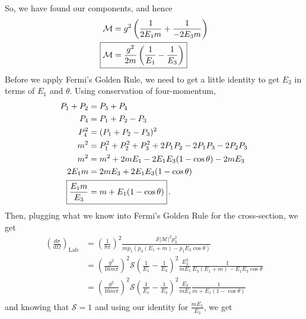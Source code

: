 \documentclass[10pt]{article}
\newcommand{\del}[2][]{\frac{d #1}{d #2}}
\begin{document}
So, we have found our components, and hence
\begin{equation*}
  \begin{split}
    \mathcal{M} & = g^{2}\left(\frac{1}{2E_{1}m} + \frac{1}{-2E_{3}m}\right) \\
    \Aboxed{\mathcal{M} & = \frac{g^{2}}{2m}\left(\frac{1}{E_{1}} - \frac{1}{E_{3}}\right)} \\
  \end{split}
\end{equation*}
Before we apply Fermi's Golden Rule, we need to get a little identity to get $E_{3}$ in terms of $E_{1}$ and $\theta$. Using conservation of four-momentum,
\begin{equation*}
  \begin{split}
    P_{1} + P_{2} & = P_{3} + P_{4} \\
    P_{4} & = P_{1} + P_{2} - P_{3} \\
    P_{4}^{2} & = (P_{1} + P_{2} - P_{3})^{2} \\
    m^{2} & = P_{1}^{2} + P_{2}^{2} + P_{3}^{2} + 2P_{1}P_{2} - 2P_{1}P_{3} - 2P_{2}P_{3} \\
    m^{2} & = m^{2} + 2mE_{1} - 2E_{1}E_{3}(1 - \cos\theta) - 2mE_{3} \\
    2E_{1}m & = 2mE_{3} + 2E_{1}E_{3}(1-\cos\theta) \\
    \Aboxed{\frac{E_{1}m}{E_{3}} & = m + E_{1}(1-\cos\theta)} \, .\\
  \end{split}
\end{equation*}
Then, plugging what we know into Fermi's Golden Rule for the cross-section, we get
\begin{equation*}
  \begin{split}
    \left(\del[\sigma]{\Omega}\right)_{\text{Lab}} & = \left(\frac{1}{8\pi}\right)^{2}\frac{\mathcal{S}|\mathcal{M}|^{2}p_{3}^{2}}{mp_{1}(p_{3}(E_{1} + m) - p_{1}E_{3}\cos\theta)} \\
    & = \left(\frac{g^{2}}{16m\pi}\right)^{2}\mathcal{S}\left(\frac{1}{E_{1}} - \frac{1}{E_{3}}\right)^{2}\frac{E_{3}^{2}}{mE_{1}}\frac{1}{E_{3}(E_{1} + m) - E_{1}E_{3}\cos\theta} \\
    & = \left(\frac{g^{2}}{16m\pi}\right)^{2}\mathcal{S}\left(\frac{1}{E_{1}} - \frac{1}{E_{3}}\right)^{2}\frac{E_{3}}{mE_{1}}\frac{1}{m + E_{1}(1 - \cos\theta)} \\
  \end{split}
\end{equation*}
and knowing that $\mathcal{S} = 1$ and using our identity for $\frac{mE_{1}}{E_{3}}$, we get
\end{document}
